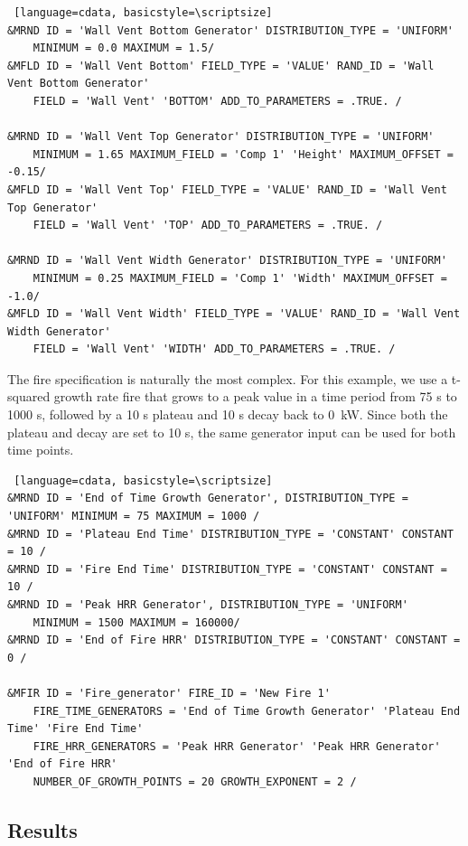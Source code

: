 \documentclass[12pt,twoside]{book}
\begin{document}
\vspace{\baselineskip}
\begin{lstlisting} [language=cdata, basicstyle=\scriptsize]
&MRND ID = 'Wall Vent Bottom Generator' DISTRIBUTION_TYPE = 'UNIFORM'
    MINIMUM = 0.0 MAXIMUM = 1.5/
&MFLD ID = 'Wall Vent Bottom' FIELD_TYPE = 'VALUE' RAND_ID = 'Wall Vent Bottom Generator'
    FIELD = 'Wall Vent' 'BOTTOM' ADD_TO_PARAMETERS = .TRUE. /

&MRND ID = 'Wall Vent Top Generator' DISTRIBUTION_TYPE = 'UNIFORM'
    MINIMUM = 1.65 MAXIMUM_FIELD = 'Comp 1' 'Height' MAXIMUM_OFFSET = -0.15/
&MFLD ID = 'Wall Vent Top' FIELD_TYPE = 'VALUE' RAND_ID = 'Wall Vent Top Generator'
    FIELD = 'Wall Vent' 'TOP' ADD_TO_PARAMETERS = .TRUE. /

&MRND ID = 'Wall Vent Width Generator' DISTRIBUTION_TYPE = 'UNIFORM'
    MINIMUM = 0.25 MAXIMUM_FIELD = 'Comp 1' 'Width' MAXIMUM_OFFSET = -1.0/
&MFLD ID = 'Wall Vent Width' FIELD_TYPE = 'VALUE' RAND_ID = 'Wall Vent Width Generator'
    FIELD = 'Wall Vent' 'WIDTH' ADD_TO_PARAMETERS = .TRUE. /
\end{lstlisting}

The fire specification is naturally the most complex. For this example, we use a t-squared growth rate fire that grows to a peak value in a time period from 75 s to 1000 s, followed by a 10 s plateau and 10 s decay back to 0~kW. Since both the plateau and decay are set to 10 s, the same generator input can be used for both time points.
\vspace{\baselineskip}
\begin{lstlisting} [language=cdata, basicstyle=\scriptsize]
&MRND ID = 'End of Time Growth Generator', DISTRIBUTION_TYPE = 'UNIFORM' MINIMUM = 75 MAXIMUM = 1000 /
&MRND ID = 'Plateau End Time' DISTRIBUTION_TYPE = 'CONSTANT' CONSTANT = 10 /
&MRND ID = 'Fire End Time' DISTRIBUTION_TYPE = 'CONSTANT' CONSTANT = 10 /
&MRND ID = 'Peak HRR Generator', DISTRIBUTION_TYPE = 'UNIFORM'
    MINIMUM = 1500 MAXIMUM = 160000/
&MRND ID = 'End of Fire HRR' DISTRIBUTION_TYPE = 'CONSTANT' CONSTANT = 0 /

&MFIR ID = 'Fire_generator' FIRE_ID = 'New Fire 1'
    FIRE_TIME_GENERATORS = 'End of Time Growth Generator' 'Plateau End Time' 'Fire End Time'
    FIRE_HRR_GENERATORS = 'Peak HRR Generator' 'Peak HRR Generator' 'End of Fire HRR'
    NUMBER_OF_GROWTH_POINTS = 20 GROWTH_EXPONENT = 2 /
\end{lstlisting}

\subsection{Results}
\end{document}
